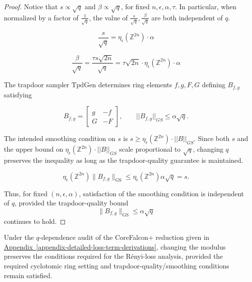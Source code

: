 \begin{proof} 

Notice that \(s \propto \sqrt{q}\) and \(\beta \propto \sqrt{q}\), for fixed \(n, \epsilon, \alpha, \tau\). 
In particular, when normalized by a factor of $\frac{1}{\sqrt{q}}$, the value of 
$\frac{s}{\sqrt{q}} , \frac{\beta}{\sqrt{q}}$ are both independent of \(q\). 


\[
\frac{s}{\sqrt{q}} = \eta_\epsilon(\mathbb{Z}^{2n}) \cdot \alpha
\]

\[
\frac{\beta}{\sqrt{q}} =  \frac{\tau s \sqrt{2n}}{\sqrt{q}}  = \tau \sqrt{2n} \cdot \eta_\epsilon(\mathbb{Z}^{2n}) \cdot \alpha
\]

The trapdoor sampler \(\mathrm{TpdGen}\) determines 
ring elements $f, g, F, G$ defining $B_{f, g}$ satisfying

\[
  B_{f, g} =
  \begin{bmatrix}
  g & -f \\
  G & -F
  \end{bmatrix},
\qquad
||B_{f,g}||_{GS} \le \alpha \sqrt{q}.
\]

The intended smoothing condition on $s$ is $s \ge \eta_\epsilon(\mathbb{Z}^{2n}) \cdot ||B||_{GS}.$
Since both \(s\) and the upper bound on
\(\eta_\epsilon(\mathbb{Z}^{2n}) \cdot ||B||_{GS}\) scale proportional to
\(\sqrt{q}\), changing \(q\) preserves the inequality as long as the trapdoor-quality guarantee is maintained. 

\[
\eta_\epsilon(\mathbb{Z}^{2n})
    \|B_{f,g}\|_{\mathrm{GS}}
\le
\eta_\epsilon(\mathbb{Z}^{2n})
    \alpha\sqrt{q}
=
s.
\]

Thus, for fixed \((n, \epsilon, \alpha)\), satisfaction of the smoothing condition is independent of \(q\),
provided the trapdoor-quality bound
\[
\|B_{f,g}\|_{\mathrm{GS}}\le\alpha\sqrt{q}
\]
continues to hold.

\end{proof}


\begin{theorem}\label{thm:sqrtq-scaling}
  Under the $q$-dependence audit of the CoreFalcon+ reduction given in
  \hyperref[appendix-detailed-loss-term-derivations]{Appendix~\ref*{appendix-detailed-loss-term-derivations}},
  changing the modulus preserves the conditions required for the R\'enyi-loss analysis,
  provided the required cyclotomic ring setting and trapdoor-quality/smoothing conditions remain satisfied.
\end{theorem}

